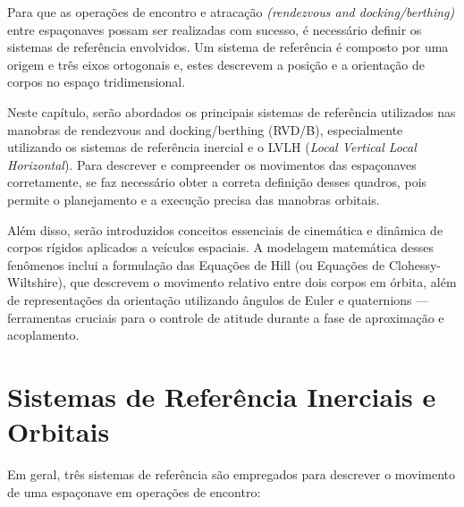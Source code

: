 Para que as operações de encontro e atracação \textit{(rendezvous and docking/berthing)} entre espaçonaves possam ser realizadas com sucesso, é necessário definir os sistemas de referência envolvidos. Um sistema de referência é composto por uma origem e três eixos ortogonais e, estes descrevem a posição e a orientação de corpos no espaço tridimensional.

Neste capítulo, serão abordados os principais sistemas de referência utilizados nas manobras de rendezvous and docking/berthing (RVD/B), especialmente utilizando os sistemas de referência inercial e o LVLH (\textit{Local Vertical Local Horizontal}). Para descrever e compreender os movimentos das espaçonaves corretamente, se faz necessário obter a correta definição desses quadros, pois permite o planejamento e a execução precisa das manobras orbitais.

Além disso, serão introduzidos conceitos essenciais de cinemática e dinâmica de corpos rígidos aplicados a veículos espaciais. A modelagem matemática desses fenômenos inclui a formulação das Equações de Hill (ou Equações de Clohessy-Wiltshire), que descrevem o movimento relativo entre dois corpos em órbita, além de representações da orientação utilizando ângulos de Euler e quaternions — ferramentas cruciais para o controle de atitude durante a fase de aproximação e acoplamento.

\section{Sistemas de Referência Inerciais e Orbitais}

Em geral, três sistemas de referência são empregados para descrever o movimento de uma espaçonave em operações de encontro:

